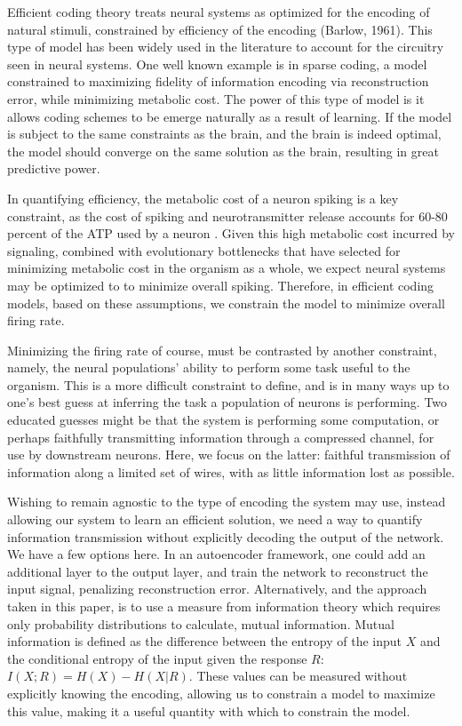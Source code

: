 \documentclass{article}
\begin{document}
Efficient coding theory treats neural systems as optimized for the encoding of natural stimuli, constrained by efficiency of the encoding (Barlow, 1961). This type of model has been widely used in the literature to account for the circuitry seen in neural systems. One well known example is in sparse coding, a model constrained to maximizing fidelity of information encoding via reconstruction error, while minimizing metabolic cost. The power of this type of model is it allows coding schemes to be emerge naturally as a result of learning. If the model is subject to the same constraints as the brain, and the brain is indeed optimal, the model should converge on the same solution as the brain, resulting in great predictive power. \par
In quantifying efficiency, the metabolic cost of a neuron spiking is a key constraint, as the cost of spiking and neurotransmitter release accounts for 60-80 percent of the ATP used by a neuron \cite{FIND CITATION}. Given this high metabolic cost incurred by signaling, combined with evolutionary bottlenecks that have selected for minimizing metabolic cost in the organism as a whole, we expect neural systems may be optimized to to minimize overall spiking. Therefore, in efficient coding models, based on these assumptions, we constrain the model to minimize overall firing rate. \par
	Minimizing the firing rate of course, must be contrasted by another constraint, namely, the neural populations’ ability to perform some task useful to the organism. This is a more difficult constraint to define, and is in many ways up to one’s best guess at inferring the task a population of neurons is performing. Two educated guesses might be that the system is performing some computation, or perhaps faithfully transmitting information through a compressed channel, for use by downstream neurons. Here, we focus on the latter: faithful transmission of information along a limited set of wires, with as little information lost as possible. \par
Wishing to remain agnostic to the type of encoding the system may use, instead allowing our system to learn an efficient solution, we need a way to quantify information transmission without explicitly decoding the output of the network. We have a few options here. In an autoencoder framework, one could add an additional layer to the output layer, and train the network to reconstruct the input signal, penalizing reconstruction error. Alternatively, and the approach taken in this paper, is to use a measure from information theory which requires only probability distributions to calculate, mutual information. Mutual information is defined as the difference between the entropy of the input $X$ and the conditional entropy of the input given the response $R$:  $I(X;R) = H(X) - H(X|R)$. These values can be measured without explicitly knowing the encoding, allowing us to constrain a model to maximize this value, making it a useful quantity with which to constrain the model. \par
\end{document}
